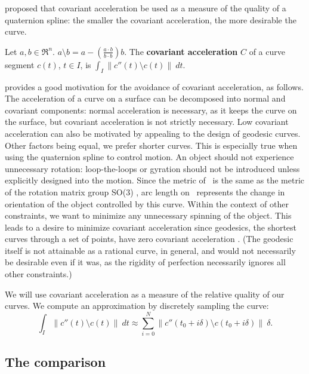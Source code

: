 \cite{barr92} proposed that covariant acceleration
be used as a measure of the quality of a quaternion spline:
the smaller the covariant acceleration, the more desirable the curve.
%
\begin{defn2}
Let $a,b \in \Re^n$.
$a \setminus b = a - (\frac{a \cdot b}{b \cdot b}) b$.
The {\bf covariant acceleration} $C$ of a curve segment $c(t)$, $t \in I$, is 
$\int_I \| c''(t) \setminus c(t)\| \ dt$.
\end{defn2}
%
\cite{barr92} provides a good motivation for the avoidance of covariant
acceleration, as follows.
The acceleration of a curve on a surface can be decomposed into
normal and covariant components: normal acceleration is necessary,
as it keeps the curve on the surface, but covariant acceleration
is not strictly necessary.
%
Low covariant acceleration can also be motivated by appealing to the design of 
geodesic curves.
Other factors being equal, we prefer shorter curves.
This is especially true when using the quaternion spline to control
motion.
An object should not experience unnecessary rotation: loop-the-loops
or gyration should not be introduced unless explicitly designed into
the motion.
Since the metric of \ is the same as the metric of the rotation
matrix group SO(3) \cite{misner73}, arc length on \ represents the
change in orientation of the object controlled by this curve.
Within the context of other constraints, 
we want to minimize any unnecessary spinning of the object.
This leads to a desire to minimize covariant acceleration since
geodesics, the shortest curves through a set of points,
have zero covariant acceleration \cite{thorpe79}.
(The geodesic itself is not attainable as a rational curve, in general,
and would not necessarily be desirable even if it was,
as the rigidity of perfection necessarily ignores all other
constraints.)

We will use covariant acceleration as a measure of the relative quality
of our curves.
We compute an approximation by discretely sampling the curve:
\[ \int_I \| c''(t) \setminus c(t)\| \ dt
\approx \sum_{i=0}^N 
	\| c''(t_0 + i \delta) \setminus c(t_0 + i \delta) \|\  \delta.
\]

\subsection{The comparison}
\label{sec:comparison}

